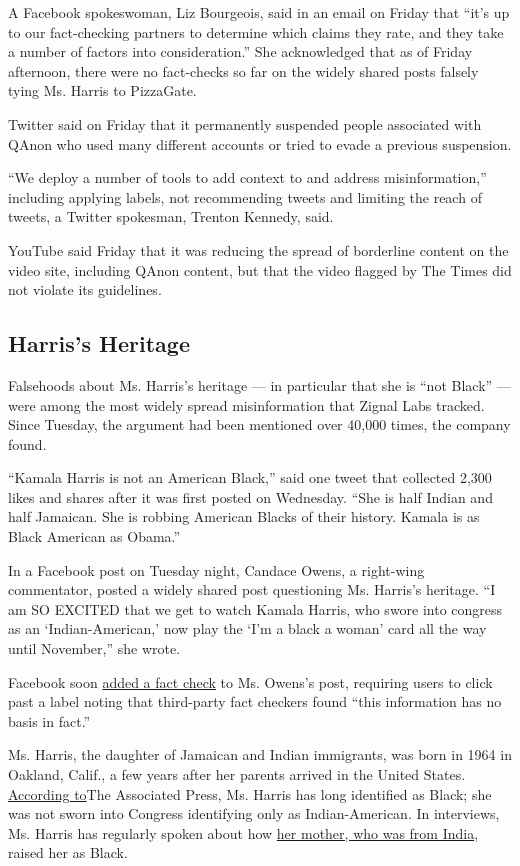 A Facebook spokeswoman, Liz Bourgeois, said in an email on Friday that
``it's up to our fact-checking partners to determine which claims they
rate, and they take a number of factors into consideration.'' She
acknowledged that as of Friday afternoon, there were no fact-checks so
far on the widely shared posts falsely tying Ms. Harris to PizzaGate.

Twitter said on Friday that it permanently suspended people associated
with QAnon who used many different accounts or tried to evade a previous
suspension.

``We deploy a number of tools to add context to and address
misinformation,'' including applying labels, not recommending tweets and
limiting the reach of tweets, a Twitter spokesman, Trenton Kennedy,
said.

YouTube said Friday that it was reducing the spread of borderline
content on the video site, including QAnon content, but that the video
flagged by The Times did not violate its guidelines.

\hypertarget{harriss-heritage}{%
\subsection{Harris's Heritage}\label{harriss-heritage}}

Falsehoods about Ms. Harris's heritage --- in particular that she is
``not Black'' --- were among the most widely spread misinformation that
Zignal Labs tracked. Since Tuesday, the argument had been mentioned over
40,000 times, the company found.

``Kamala Harris is not an American Black,'' said one tweet that
collected 2,300 likes and shares after it was first posted on Wednesday.
``She is half Indian and half Jamaican. She is robbing American Blacks
of their history. Kamala is as Black American as Obama.''

In a Facebook post on Tuesday night, Candace Owens, a right-wing
commentator, posted a widely shared post questioning Ms. Harris's
heritage. ``I am SO EXCITED that we get to watch Kamala Harris, who
swore into congress as an `Indian-American,' now play the `I'm a black a
woman' card all the way until November,'' she wrote.

Facebook soon \href{https://apnews.com/afs:Content:9240201328}{added a
fact check} to Ms. Owens's post, requiring users to click past a label
noting that third-party fact checkers found ``this information has no
basis in fact.''

Ms. Harris, the daughter of Jamaican and Indian immigrants, was born in
1964 in Oakland, Calif., a few years after her parents arrived in the
United States.
\href{https://apnews.com/afs:Content:9240201328}{According to}The
Associated Press, Ms. Harris has long identified as Black; she was not
sworn into Congress identifying only as Indian-American. In interviews,
Ms. Harris has regularly spoken about how
\href{https://www.nytimes3xbfgragh.onion/2020/08/16/world/asia/kamala-harris-india.html}{her
mother, who was from India}, raised her as Black.

